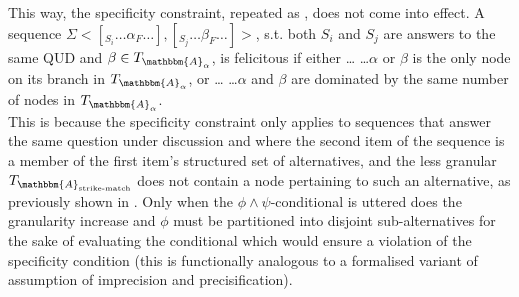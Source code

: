 \noindent This way, the specificity constraint, repeated as , does not come into effect.
\pex{}%
A sequence $\Sigma<[_{S_i}\ldots\alpha_F\ldots],[_{S_j}\ldots\beta_F\ldots]>$, s.t. both
$S_i$ and $S_j$ are answers to the same QUD and $\beta\in T_{\mathbbm{A}_\alpha}$, is felicitous if either \dots
\a{} \dots $\alpha$ or $\beta$ is the only node on its branch in $T_{\mathbbm{A}_\alpha}$, or \dots {}
\a{} \dots $\alpha$ and $\beta$ are dominated by the same number of nodes in $T_{\mathbbm{A}_\alpha}$.\\\emptyfill\parencite[p.~643]{Ippolito2020}
\xe
This is because the specificity constraint only applies to sequences that answer the same question under discussion and where the second item of the sequence is a member of the first item's structured set of alternatives, and the less granular $T_{\mathbbm{A}_\text{strike-match}}$ does not contain a node pertaining to such an alternative, as previously shown in . Only when the $\phi\land\psi$-conditional is uttered does the granularity increase and $\phi$ must be partitioned into disjoint sub-alternatives for the sake of evaluating the conditional which would ensure a violation of the specificity condition (this is functionally analogous to a formalised variant of  assumption of imprecision and precisification).

